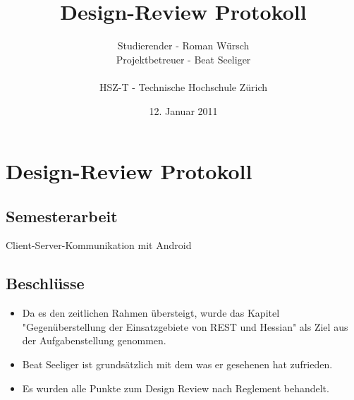 \documentclass[listof=totoc,bibliography=totoc]{scrreprt}
\title{Design-Review Protokoll}
\author{Studierender - Roman Würsch\\
    Projektbetreuer - Beat Seeliger\\
    \\
    HSZ-T - Technische Hochschule Zürich}
\date{12. Januar 2011}
\begin{document}
    \ifpdf
    \else
    \fi

    \maketitle



    \chapter{Design-Review Protokoll}

    \section{Semesterarbeit}
    Client-Server-Kommunikation mit Android

    \section{Beschlüsse}
    \begin{itemize}
        \item Da es den zeitlichen Rahmen übersteigt, wurde das Kapitel "Gegenüberstellung der Einsatzgebiete von REST und Hessian" als Ziel aus der Aufgabenstellung genommen.
        \item Beat Seeliger ist grundsätzlich mit dem was er gesehenen hat zufrieden.
        \item Es wurden alle Punkte zum Design Review nach Reglement behandelt.
    \end{itemize}
    
\end{document}
